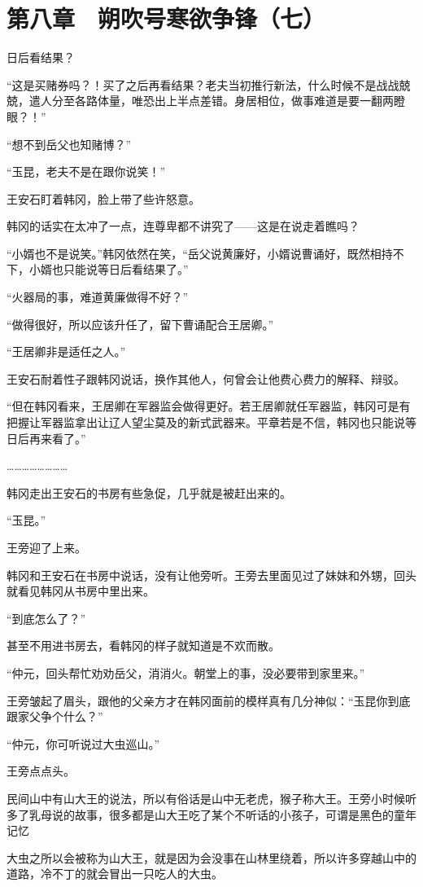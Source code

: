 \section{第八章　朔吹号寒欲争锋（七）}

日后看结果？

“这是买赌券吗？！买了之后再看结果？老夫当初推行新法，什么时候不是战战兢兢，遣人分至各路体量，唯恐出上半点差错。身居相位，做事难道是要一翻两瞪眼？！”

“想不到岳父也知赌博？”

“玉昆，老夫不是在跟你说笑！”

王安石盯着韩冈，脸上带了些许怒意。

韩冈的话实在太冲了一点，连尊卑都不讲究了——这是在说走着瞧吗？

“小婿也不是说笑。”韩冈依然在笑，“岳父说黄廉好，小婿说曹诵好，既然相持不下，小婿也只能说等日后看结果了。”

“火器局的事，难道黄廉做得不好？”

“做得很好，所以应该升任了，留下曹诵配合王居卿。”

“王居卿非是适任之人。”

王安石耐着性子跟韩冈说话，换作其他人，何曾会让他费心费力的解释、辩驳。

“但在韩冈看来，王居卿在军器监会做得更好。若王居卿就任军器监，韩冈可是有把握让军器监拿出让辽人望尘莫及的新式武器来。平章若是不信，韩冈也只能说等日后再来看了。”

……………………

韩冈走出王安石的书房有些急促，几乎就是被赶出来的。

“玉昆。”

王旁迎了上来。

韩冈和王安石在书房中说话，没有让他旁听。王旁去里面见过了妹妹和外甥，回头就看见韩冈从书房中里出来。

“到底怎么了？”

甚至不用进书房去，看韩冈的样子就知道是不欢而散。

“仲元，回头帮忙劝劝岳父，消消火。朝堂上的事，没必要带到家里来。”

王旁皱起了眉头，跟他的父亲方才在韩冈面前的模样真有几分神似：“玉昆你到底跟家父争个什么？”

“仲元，你可听说过大虫巡山。”

王旁点点头。

民间山中有山大王的说法，所以有俗话是山中无老虎，猴子称大王。王旁小时候听多了乳母说的故事，很多都是山大王吃了某个不听话的小孩子，可谓是黑色的童年记忆

大虫之所以会被称为山大王，就是因为会没事在山林里绕着，所以许多穿越山中的道路，冷不丁的就会冒出一只吃人的大虫。


